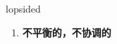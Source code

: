 
\begin{frame}
{\huge lopsided}
\begin{center}
\begin{enumerate}\Large
  \item \textbf{不平衡的，不协调的}
\end{enumerate}
\end{center}
\end{frame}
